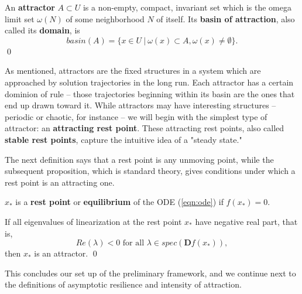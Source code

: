 \begin{definition}
	An \textbf{attractor} $A \subset U$ is a non-empty, compact, invariant set which is the omega limit set $\omega(N)$ of some neighborhood $N$ of itself. Its \textbf{basin of attraction}, also called its \textbf{domain}, is $$basin(A) = \{x \in U ~|~ \omega(x) \subset A, \omega(x) \neq \emptyset\}.$$ \qed
\end{definition}

As mentioned, attractors are the fixed structures in a system which are approached by solution trajectories in the long run. Each attractor has a certain dominion of rule -- those trajectories beginning within its basin are the ones that end up drawn toward it. While attractors may have interesting structures -- periodic or chaotic, for instance -- we will begin with the simplest type of attractor: an \textbf{attracting rest point}. These attracting rest points, also called \textbf{stable rest points}, capture the intuitive idea of a "steady state." 

The next definition says that a rest point is any unmoving point, while the subsequent proposition, which is standard theory, gives conditions under which a rest point is an attracting one.

\begin{definition}
	$x_\ast$ is a \textbf{rest point} or \textbf{equilibrium} of the ODE (\ref{eqn:ode}) if $f(x_\ast) = 0$.
\end{definition}


\begin{proposition}
	If all eigenvalues of linearization at the rest point $x_{\ast}$ have negative real part, that is, $$Re(\lambda) < 0 \text{ for all } \lambda \in spec(\textbf{D}f(x_\ast)),$$ 
then $x_{\ast}$ is an attractor. %
\qed
\end{proposition}

This concludes our set up of the preliminary framework, and we continue next to the definitions of asymptotic resilience and intensity of attraction.



%


